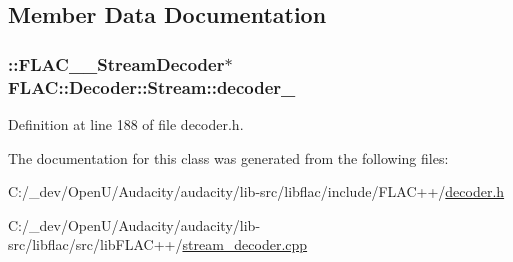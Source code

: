 \subsection{Member Data Documentation}
\subsubsection[{\texorpdfstring{decoder\+\_\+}{decoder_}}]{\setlength{\rightskip}{0pt plus 5cm}\+::{\bf F\+L\+A\+C\+\_\+\+\_\+\+Stream\+Decoder}$\ast$ F\+L\+A\+C\+::\+Decoder\+::\+Stream\+::decoder\+\_\+\hspace{0.3cm}{\ttfamily [protected]}}\hypertarget{class_f_l_a_c_1_1_decoder_1_1_stream_a61f72b653d6171edaf5e7cdf916b98aa}{}\label{class_f_l_a_c_1_1_decoder_1_1_stream_a61f72b653d6171edaf5e7cdf916b98aa}


Definition at line 188 of file decoder.\+h.



The documentation for this class was generated from the following files\+:\begin{DoxyCompactItemize}
\item 
C\+:/\+\_\+dev/\+Open\+U/\+Audacity/audacity/lib-\/src/libflac/include/\+F\+L\+A\+C++/\hyperlink{libflac_2include_2_f_l_a_c_09_09_2decoder_8h}{decoder.\+h}\item 
C\+:/\+\_\+dev/\+Open\+U/\+Audacity/audacity/lib-\/src/libflac/src/lib\+F\+L\+A\+C++/\hyperlink{stream__decoder_8cpp}{stream\+\_\+decoder.\+cpp}\end{DoxyCompactItemize}
